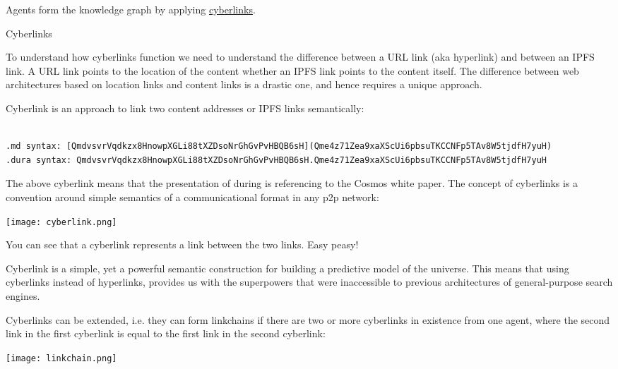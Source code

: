 \documentclass[8pt,oneside]{amsart}
\makeatletter
\newcommand{\linkred}[2]{\href{#1}{\color{red}{#2}}}
\renewcommand\subsection{\@startsection{subsection}
                                    {2}{\z@}
                                    {-3.25ex\@plus -1ex \@minus -.2ex}
                                    {0ex \@plus .2ex}
                                    {\play\Large}
                        }
\newcommand{\titleSection}[1]{\subsection{#1}}
\newenvironment{Figure}
  {\par\medskip\noindent\minipage{\linewidth}}
  {\endminipage\par\medskip}
\makeatother
\begin{document}
Agents form the knowledge graph by applying {\hyperref[cyberlinks]{cyberlinks}}.

\titleSection{Cyberlinks}\label{cyberlinks}

To understand how cyberlinks function we need to understand the difference between a URL link (aka hyperlink) and between an IPFS link. A URL link points to the location of the content whether an IPFS link points to the content itself. The difference between web architectures based on location links and content links is a drastic one, and hence requires a unique approach.

Cyberlink is an approach to link two content addresses or IPFS links semantically:

\begin{lstlisting}

.md syntax: [QmdvsvrVqdkzx8HnowpXGLi88tXZDsoNrGhGvPvHBQB6sH](Qme4z71Zea9xaXScUi6pbsuTKCCNFp5TAv8W5tjdfH7yuH)
.dura syntax: QmdvsvrVqdkzx8HnowpXGLi88tXZDsoNrGhGvPvHBQB6sH.Qme4z71Zea9xaXScUi6pbsuTKCCNFp5TAv8W5tjdfH7yuH
\end{lstlisting}

The above cyberlink means that the presentation of \linkred{https://github.com/cybercongress/cyberd}{cyberd} during \linkred{https://etherscan.io/token/0x61B81103e716B611Fff8aF5A5Dc8f37C628efb1E}{cyberc0n} is referencing to the Cosmos white paper. The concept of cyberlinks is a convention around simple semantics of a communicational format in any p2p network:

\begin{Figure}
    \centering
    \texttt{[image: cyberlink.png]}
\end{Figure}

You can see that a cyberlink represents a link between the two links. Easy peasy!

Cyberlink is a simple, yet a powerful semantic construction for building a predictive model of the universe. This means that using cyberlinks instead of hyperlinks, provides us with the superpowers that were inaccessible to previous architectures of general-purpose search engines.

Cyberlinks can be extended, i.e. they can form linkchains if there are two or more cyberlinks in existence from one agent, where the second link in the first cyberlink is equal to the first link in the second cyberlink:

\begin{Figure}
    \centering
    \texttt{[image: linkchain.png]}
\end{Figure}
\end{document}

